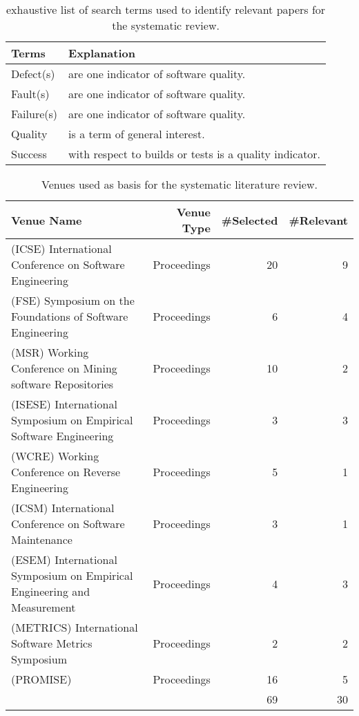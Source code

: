 \begin{table}
\centering
\begin{tabular}{ll}
\toprule
Terms & Explanation\\
\midrule
Defect(s) & are one indicator of software quality.\\
Fault(s) &are one indicator of software quality.\\
Failure(s) &are one indicator of software quality.\\
Quality & is a term of general interest.\\
Success & with respect to builds or tests is a quality indicator.\\
\bottomrule
\end{tabular}
\caption{exhaustive list of search terms used to identify relevant papers for the systematic review.}
\label{chap:6:tab:terms}
\end{table}

\begin{sidewaystable}[ht!]
\centering
\begin{tabular}{lrrr}
\toprule
Venue Name & Venue Type & \#Selected & \#Relevant\\
\midrule
(ICSE) International Conference on Software Engineering & Proceedings & 20 & 9\\
(FSE) Symposium on the Foundations of Software Engineering & Proceedings & 6 & 4\\
(MSR) Working Conference on Mining software Repositories & Proceedings & 10 & 2\\
(ISESE) International Symposium on Empirical Software Engineering & Proceedings & 3 & 3\\
(WCRE) Working Conference on Reverse Engineering & Proceedings & 5 & 1\\
(ICSM) International Conference on Software Maintenance & Proceedings & 3 & 1\\
(ESEM) International Symposium on Empirical Engineering and Measurement & Proceedings & 4 & 3\\
(METRICS) International Software Metrics Symposium & Proceedings & 2 & 2\\
(PROMISE) & Proceedings & 16 & 5\\
\midrule
&&69&30\\
\bottomrule
\end{tabular}
\caption{Venues used as basis for the systematic literature review.}
\label{chap:6:tab:venues}
\end{sidewaystable}

